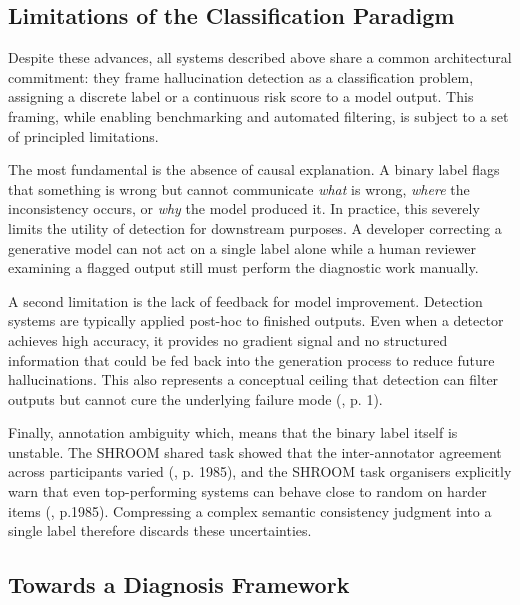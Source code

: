 \documentclass[
  seminar,   	 
  english,   	 
  titlepage=on,
  captions=tableheadings
]{ttlab-qualify}
\begin{document}
\subsection{Limitations of the Classification Paradigm} 
\label{limitations}

Despite these advances, all systems described above share a common architectural commitment: they frame hallucination detection as a classification problem, assigning a discrete label or a continuous risk score to a model output. This framing, while enabling benchmarking and automated filtering, is subject to a set of principled limitations.

The most fundamental is the absence of causal explanation. A binary label flags that something is wrong but cannot communicate \textit{what} is wrong, \textit{where} the inconsistency occurs, or \textit{why} the model produced it. In practice, this severely limits the utility of detection for downstream purposes. A developer correcting a generative model can not act on a single label alone while a human reviewer examining a flagged output still must perform the diagnostic work manually.

A second limitation is the lack of feedback for model improvement. Detection systems are typically applied post-hoc to finished outputs. Even when a detector achieves high accuracy, it provides no gradient signal and no structured information that could be fed back into the generation process to reduce future hallucinations. This also represents a conceptual ceiling that detection can filter outputs but cannot cure the underlying failure mode (\cite{liu2025detection}, p. 1).

Finally, annotation ambiguity which, means that the binary label itself is unstable. The SHROOM shared task showed that the inter-annotator agreement across participants varied (\cite{mickus2024shroom}, p. 1985), and the SHROOM task organisers explicitly warn that even top-performing systems can behave close to random on harder items (\cite{mickus2024shroom}, p.1985). Compressing a complex semantic consistency judgment into a single label therefore discards these uncertainties.

\subsection{Towards a Diagnosis Framework}
\end{document}

